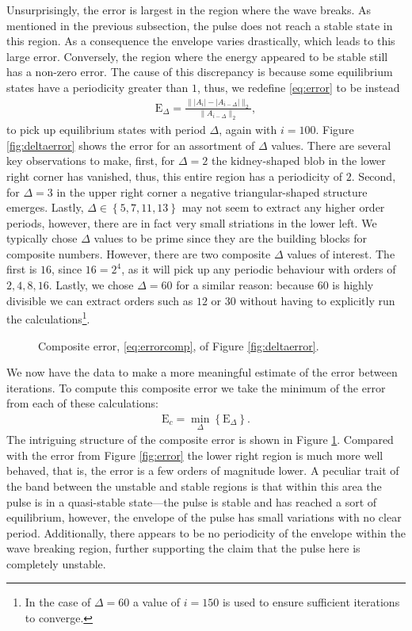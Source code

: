 Unsurprisingly, the error is largest in the region where the wave breaks. As mentioned in the previous subsection, the pulse does not reach a stable state in this region. As a consequence the envelope varies drastically, which leads to this large error. Conversely, the region where the energy appeared to be stable still has a non-zero error. The cause of this discrepancy is because some equilibrium states have a periodicity greater than $1$, thus, we redefine \eqref{eq:error} to be instead
\begin{align}
\textrm{E}_\Delta = \frac{\| |A_i| - |A_{i-\Delta}| \|_2}{\| A_{i-\Delta} \|_2},
\label{eq:deltaerror}
\end{align}
to pick up equilibrium states with period $\Delta$, again with $i = 100$. Figure \ref{fig:deltaerror} shows the error for an assortment of $\Delta$ values. There are several key observations to make, first, for $\Delta = 2$ the kidney-shaped blob in the lower right corner has vanished, thus, this entire region has a periodicity of $2$. Second, for $\Delta = 3$ in the upper right corner a negative triangular-shaped structure emerges. Lastly, $\Delta \in \left\{ 5, 7, 11, 13 \right\}$ may not seem to extract any higher order periods, however, there are in fact very small striations in the lower left. We typically chose $\Delta$ values to be prime since they are the building blocks for composite numbers. However, there are two composite $\Delta$ values of interest. The first is $16$, since $16 = 2^4$, as it will pick up any periodic behaviour with orders of $2, 4, 8, 16$. Lastly, we chose $\Delta = 60$ for a similar reason: because $60$ is highly divisible we can extract orders such as $12$ or $30$ without having to explicitly run the calculations\footnote{In the case of $\Delta = 60$ a value of $i = 150$ is used to ensure sufficient iterations to converge.}. \\

\begin{figure}[tbp]

\caption[Composite error.]{Composite error, \eqref{eq:errorcomp}, of Figure \ref{fig:deltaerror}.}
\label{fig:errorcomp}
\end{figure}

We now have the data to make a more meaningful estimate of the error between iterations. To compute this composite error we take the minimum of the error from each of these calculations:
\begin{align}
\textrm{E}_c = \min_\Delta \left\{ \textrm{E}_\Delta \right\}.
\label{eq:errorcomp}
\end{align}
The intriguing structure of the composite error is shown in Figure \ref{fig:errorcomp}. Compared with the error from Figure \ref{fig:error} the lower right region is much more well behaved, that is, the error is a few orders of magnitude lower. A peculiar trait of the band between the unstable and stable regions is that within this area the pulse is in a quasi-stable state---the pulse is stable and has reached a sort of equilibrium, however, the envelope of the pulse has small variations with no clear period. Additionally, there appears to be no periodicity of the envelope within the wave breaking region, further supporting the claim that the pulse here is completely unstable.

